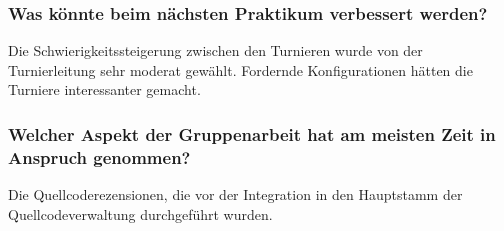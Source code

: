 \documentclass[runningheads]{llncs}
\begin{document}
	\subsubsection{Was könnte beim nächsten Praktikum verbessert werden?\\}
	Die Schwierigkeitssteigerung zwischen den Turnieren wurde von der Turnierleitung sehr moderat gewählt. Fordernde Konfigurationen hätten die Turniere interessanter gemacht.
	\subsubsection{Welcher Aspekt der Gruppenarbeit hat am meisten Zeit in Anspruch genommen?\\}
	Die Quellcoderezensionen, die vor der Integration in den Hauptstamm der Quellcodeverwaltung durchgeführt wurden. 
	
\end{document}
